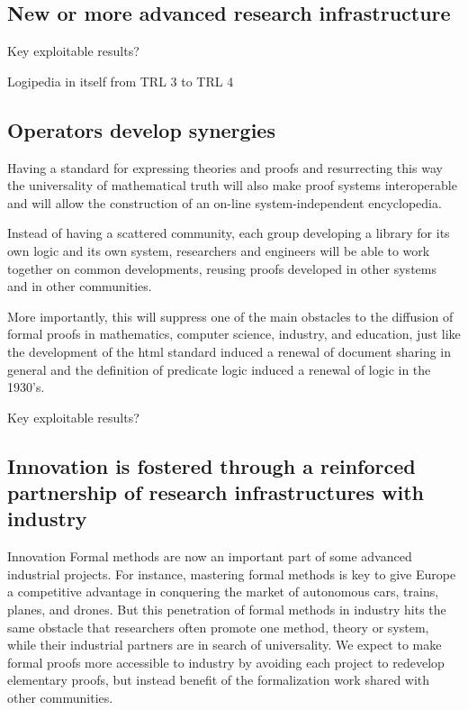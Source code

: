 \subsection{New or more advanced research infrastructure}

{\color{red} Key exploitable results?}

Logipedia in itself from TRL 3 to TRL 4


\subsection{Operators develop synergies}

Having a standard for expressing theories and proofs and resurrecting
this way the universality of mathematical truth will also make proof
systems interoperable and will allow the construction of an on-line
system-independent encyclopedia.

Instead of having a scattered community, each group developing a
library for its own logic and its own system, researchers and
engineers will be able to work together on common developments,
reusing proofs developed in other systems and in other communities.

More importantly, this will suppress one of the main obstacles to the
diffusion of formal proofs in mathematics, computer science, industry,
and education, just like the development of the html standard induced
a renewal of document sharing in general and the definition of
predicate logic induced a renewal of logic in the 1930's.


{\color{red} Key exploitable results?}


\subsection{Innovation is fostered through a reinforced partnership of research
infrastructures with industry}

Innovation Formal methods are now an important part of some advanced
industrial projects. For instance, mastering formal methods is key to
give Europe a competitive advantage in conquering the market of
autonomous cars, trains, planes, and drones. But this penetration of
formal methods in industry hits the same obstacle that researchers
often promote one method, theory or system, while their industrial
partners are in search of universality. We expect to make formal
proofs more accessible to industry by avoiding each project to
redevelop elementary proofs, but instead benefit of the formalization
work shared with other communities.

